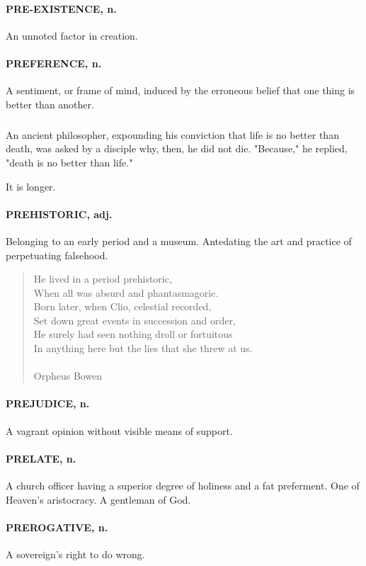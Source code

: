 \documentclass[11pt]{article}
\begin{document}
\paragraph{PRE-EXISTENCE, n.}  An unnoted factor in creation.

\paragraph{PREFERENCE, n.}  A sentiment, or frame of mind, induced by the
erroneous belief that one thing is better than another.
\subparagraph{}   An ancient philosopher, expounding his conviction that life is no
better than death, was asked by a disciple why, then, he did not die.
"Because," he replied, "death is no better than life." 

   It is longer.
 
\paragraph{PREHISTORIC, adj.}  Belonging to an early period and a museum.
Antedating the art and practice of perpetuating falsehood.

\begin{quote}   He lived in a period prehistoric, \\
  When all was absurd and phantasmagoric. \\
  Born later, when Clio, celestial recorded, \\
  Set down great events in succession and order, \\
  He surely had seen nothing droll or fortuitous \\
  In anything here but the lies that she threw at us. \\
 \\
Orpheus Bowen \end{quote}


\paragraph{PREJUDICE, n.}  A vagrant opinion without visible means of support.

\paragraph{PRELATE, n.}  A church officer having a superior degree of holiness and
a fat preferment.  One of Heaven's aristocracy.  A gentleman of God.

\paragraph{PREROGATIVE, n.}  A sovereign's right to do wrong.
\end{document}
